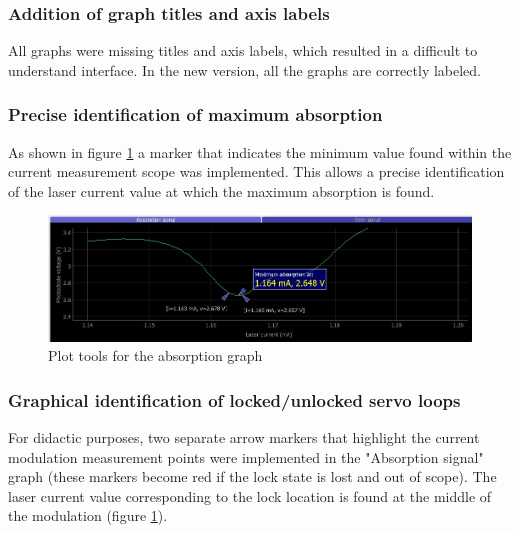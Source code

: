 \documentclass[a4paper,12pt]{article}
\begin{document}
\subsubsection{Addition of graph titles and axis labels}
\label{section:graphs}

All graphs were missing titles and axis labels, which resulted in a difficult to understand interface. In the new version, all the graphs are correctly labeled.

\subsubsection{Precise identification of maximum absorption}
\label{section:max_absorb}
 As shown in figure \ref{fig:plot_tools_1} a marker that indicates the minimum value found within the current measurement scope was implemented. This allows a precise identification of the laser current value at which the maximum absorption is found. 

\begin{figure}[!h]
\centering
\includegraphics[width=\textwidth]{Images/plot_tools_1.png}
\captionsetup{justification=centering}
\caption{Plot tools for the absorption graph} 
\label{fig:plot_tools_1}
\end{figure}
    
\subsubsection{Graphical identification of locked/unlocked servo loops}
\label{section:lock/unlock}

For didactic purposes, two separate arrow markers that highlight the current modulation measurement points were implemented in the "Absorption signal" graph (these markers become red if the lock state is lost and out of scope). The laser current value corresponding to the lock location is found at the middle of the modulation (figure \ref{fig:plot_tools_1}).
\end{document}
